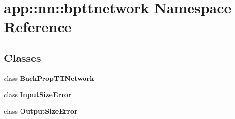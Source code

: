 \section{app::nn::bpttnetwork Namespace Reference}
\label{namespaceapp_1_1nn_1_1bpttnetwork}


\subsection*{Classes}
\begin{CompactItemize}
\item 
class {\bf BackPropTTNetwork}
\item 
class {\bf InputSizeError}
\item 
class {\bf OutputSizeError}
\end{CompactItemize}

